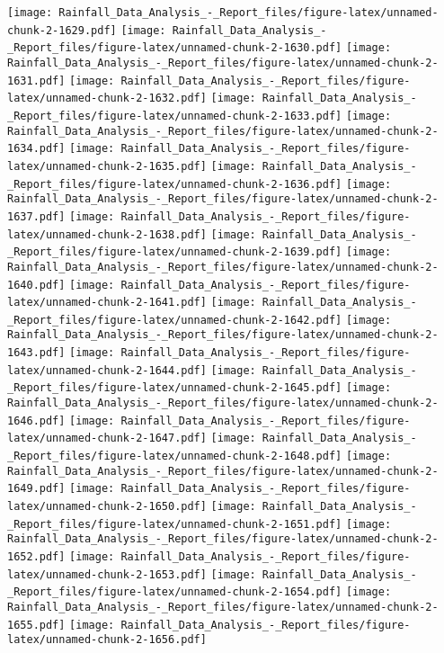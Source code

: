 \documentclass[
]{article}
\begin{document}
\texttt{[image: Rainfall\_Data\_Analysis\_-\_Report\_files/figure-latex/unnamed-chunk-2-1629.pdf]}
\texttt{[image: Rainfall\_Data\_Analysis\_-\_Report\_files/figure-latex/unnamed-chunk-2-1630.pdf]}
\texttt{[image: Rainfall\_Data\_Analysis\_-\_Report\_files/figure-latex/unnamed-chunk-2-1631.pdf]}
\texttt{[image: Rainfall\_Data\_Analysis\_-\_Report\_files/figure-latex/unnamed-chunk-2-1632.pdf]}
\texttt{[image: Rainfall\_Data\_Analysis\_-\_Report\_files/figure-latex/unnamed-chunk-2-1633.pdf]}
\texttt{[image: Rainfall\_Data\_Analysis\_-\_Report\_files/figure-latex/unnamed-chunk-2-1634.pdf]}
\texttt{[image: Rainfall\_Data\_Analysis\_-\_Report\_files/figure-latex/unnamed-chunk-2-1635.pdf]}
\texttt{[image: Rainfall\_Data\_Analysis\_-\_Report\_files/figure-latex/unnamed-chunk-2-1636.pdf]}
\texttt{[image: Rainfall\_Data\_Analysis\_-\_Report\_files/figure-latex/unnamed-chunk-2-1637.pdf]}
\texttt{[image: Rainfall\_Data\_Analysis\_-\_Report\_files/figure-latex/unnamed-chunk-2-1638.pdf]}
\texttt{[image: Rainfall\_Data\_Analysis\_-\_Report\_files/figure-latex/unnamed-chunk-2-1639.pdf]}
\texttt{[image: Rainfall\_Data\_Analysis\_-\_Report\_files/figure-latex/unnamed-chunk-2-1640.pdf]}
\texttt{[image: Rainfall\_Data\_Analysis\_-\_Report\_files/figure-latex/unnamed-chunk-2-1641.pdf]}
\texttt{[image: Rainfall\_Data\_Analysis\_-\_Report\_files/figure-latex/unnamed-chunk-2-1642.pdf]}
\texttt{[image: Rainfall\_Data\_Analysis\_-\_Report\_files/figure-latex/unnamed-chunk-2-1643.pdf]}
\texttt{[image: Rainfall\_Data\_Analysis\_-\_Report\_files/figure-latex/unnamed-chunk-2-1644.pdf]}
\texttt{[image: Rainfall\_Data\_Analysis\_-\_Report\_files/figure-latex/unnamed-chunk-2-1645.pdf]}
\texttt{[image: Rainfall\_Data\_Analysis\_-\_Report\_files/figure-latex/unnamed-chunk-2-1646.pdf]}
\texttt{[image: Rainfall\_Data\_Analysis\_-\_Report\_files/figure-latex/unnamed-chunk-2-1647.pdf]}
\texttt{[image: Rainfall\_Data\_Analysis\_-\_Report\_files/figure-latex/unnamed-chunk-2-1648.pdf]}
\texttt{[image: Rainfall\_Data\_Analysis\_-\_Report\_files/figure-latex/unnamed-chunk-2-1649.pdf]}
\texttt{[image: Rainfall\_Data\_Analysis\_-\_Report\_files/figure-latex/unnamed-chunk-2-1650.pdf]}
\texttt{[image: Rainfall\_Data\_Analysis\_-\_Report\_files/figure-latex/unnamed-chunk-2-1651.pdf]}
\texttt{[image: Rainfall\_Data\_Analysis\_-\_Report\_files/figure-latex/unnamed-chunk-2-1652.pdf]}
\texttt{[image: Rainfall\_Data\_Analysis\_-\_Report\_files/figure-latex/unnamed-chunk-2-1653.pdf]}
\texttt{[image: Rainfall\_Data\_Analysis\_-\_Report\_files/figure-latex/unnamed-chunk-2-1654.pdf]}
\texttt{[image: Rainfall\_Data\_Analysis\_-\_Report\_files/figure-latex/unnamed-chunk-2-1655.pdf]}
\texttt{[image: Rainfall\_Data\_Analysis\_-\_Report\_files/figure-latex/unnamed-chunk-2-1656.pdf]}
\end{document}
